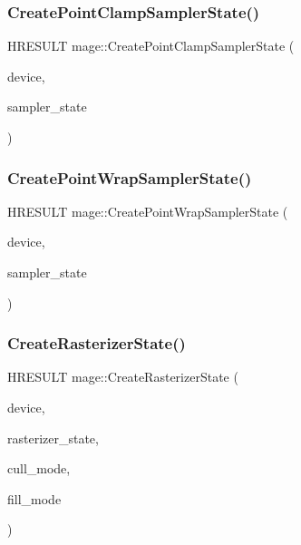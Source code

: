 \subsubsection{\texorpdfstring{Create\+Point\+Clamp\+Sampler\+State()}{CreatePointClampSamplerState()}}
{\footnotesize\ttfamily H\+R\+E\+S\+U\+LT mage\+::\+Create\+Point\+Clamp\+Sampler\+State (\begin{DoxyParamCaption}\item[{I\+D3\+D11\+Device2 $\ast$}]{device,  }\item[{I\+D3\+D11\+Sampler\+State $\ast$$\ast$}]{sampler\+\_\+state }\end{DoxyParamCaption})}

\hypertarget{namespacemage_a172296a60b063da1f01ad0a4ec828772}{}\label{namespacemage_a172296a60b063da1f01ad0a4ec828772} 
\subsubsection{\texorpdfstring{Create\+Point\+Wrap\+Sampler\+State()}{CreatePointWrapSamplerState()}}
{\footnotesize\ttfamily H\+R\+E\+S\+U\+LT mage\+::\+Create\+Point\+Wrap\+Sampler\+State (\begin{DoxyParamCaption}\item[{I\+D3\+D11\+Device2 $\ast$}]{device,  }\item[{I\+D3\+D11\+Sampler\+State $\ast$$\ast$}]{sampler\+\_\+state }\end{DoxyParamCaption})}

\hypertarget{namespacemage_a801f8c5a484129ae6717733de626b625}{}\label{namespacemage_a801f8c5a484129ae6717733de626b625} 
\subsubsection{\texorpdfstring{Create\+Rasterizer\+State()}{CreateRasterizerState()}}
{\footnotesize\ttfamily H\+R\+E\+S\+U\+LT mage\+::\+Create\+Rasterizer\+State (\begin{DoxyParamCaption}\item[{I\+D3\+D11\+Device2 $\ast$}]{device,  }\item[{I\+D3\+D11\+Rasterizer\+State $\ast$$\ast$}]{rasterizer\+\_\+state,  }\item[{D3\+D11\+\_\+\+C\+U\+L\+L\+\_\+\+M\+O\+DE}]{cull\+\_\+mode,  }\item[{D3\+D11\+\_\+\+F\+I\+L\+L\+\_\+\+M\+O\+DE}]{fill\+\_\+mode }\end{DoxyParamCaption})}

